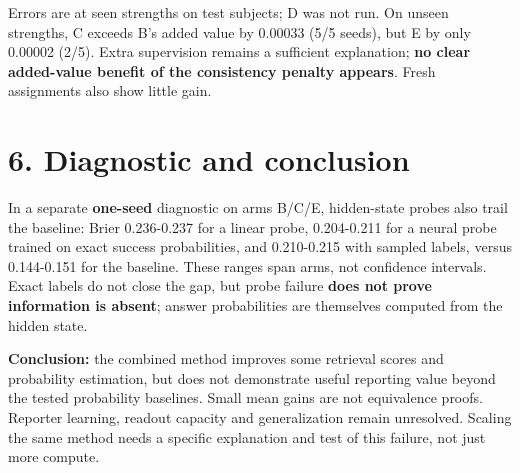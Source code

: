\documentclass[10pt,a4paper]{article}
\begin{document}
\par{}\par\smallskip

Errors are at seen strengths on test subjects; D was not run. On unseen strengths, C exceeds B's added value by 0.00033 (5/5 seeds), but E by only 0.00002 (2/5). Extra supervision remains a sufficient explanation; \textbf{no clear added-value benefit of the consistency penalty appears}. Fresh assignments also show little gain.
\par

\section*{6. Diagnostic and conclusion}

In a separate \textbf{one-seed} diagnostic on arms B/C/E, hidden-state probes also trail the baseline: Brier 0.236-0.237 for a linear probe, 0.204-0.211 for a neural probe trained on exact success probabilities, and 0.210-0.215 with sampled labels, versus 0.144-0.151 for the baseline. These ranges span arms, not confidence intervals. Exact labels do not close the gap, but probe failure \textbf{does not prove information is absent}; answer probabilities are themselves computed from the hidden state.
\par

\textbf{Conclusion:} the combined method improves some retrieval scores and probability estimation, but does not demonstrate useful reporting value beyond the tested probability baselines. Small mean gains are not equivalence proofs. Reporter learning, readout capacity and generalization remain unresolved. Scaling the same method needs a specific explanation and test of this failure, not just more compute.
\par
\end{document}
